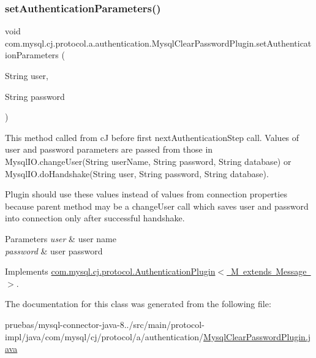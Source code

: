 \subsubsection{\texorpdfstring{set\+Authentication\+Parameters()}{setAuthenticationParameters()}}
{\footnotesize\ttfamily void com.\+mysql.\+cj.\+protocol.\+a.\+authentication.\+Mysql\+Clear\+Password\+Plugin.\+set\+Authentication\+Parameters (\begin{DoxyParamCaption}\item[{String}]{user,  }\item[{String}]{password }\end{DoxyParamCaption})}

This method called from cJ before first next\+Authentication\+Step call. Values of user and password parameters are passed from those in Mysql\+I\+O.\+change\+User(String user\+Name, String password, String database) or Mysql\+I\+O.\+do\+Handshake(String user, String password, String database).

Plugin should use these values instead of values from connection properties because parent method may be a change\+User call which saves user and password into connection only after successful handshake.


\begin{DoxyParams}{Parameters}
{\em user} & user name \\
\hline
{\em password} & user password \\
\hline
\end{DoxyParams}


Implements \mbox{\hyperlink{interfacecom_1_1mysql_1_1cj_1_1protocol_1_1_authentication_plugin_a22458c3992dbf9f91560d75a99e234d3}{com.\+mysql.\+cj.\+protocol.\+Authentication\+Plugin$<$ M extends Message $>$}}.



The documentation for this class was generated from the following file\+:\begin{DoxyCompactItemize}
\item 
pruebas/mysql-\/connector-\/java-\/8../src/main/protocol-\/impl/java/com/mysql/cj/protocol/a/authentication/\mbox{\hyperlink{_mysql_clear_password_plugin_8java}{Mysql\+Clear\+Password\+Plugin.\+java}}\end{DoxyCompactItemize}
